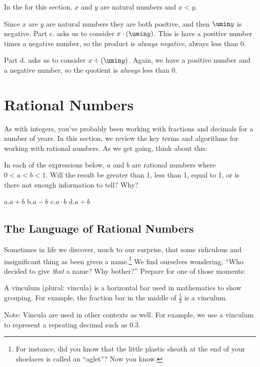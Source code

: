 \begin{boxedex}
In the  for this section, $x$ and $y$ are natural numbers and $x<y$.

Since $x$ are $y$ are natural numbers they are both positive, and then $\umin y$ is negative. Part c. asks us to consider $x\cdot(\umin y)$. This is have a positive number times a negative number, so the product is {\em always negative}, always less than 0.

Part d. asks us to consider $x\div(\umin y)$. Again, we have a positive number and a negative number, so the quotient is {\em always} less than 0.
\end{boxedex}


\section{Rational Numbers}
\label{sec:rationals}

As with integers, you've probably been working with fractions and decimals for a number of years. In this section, we review the key terms and algorithms for working with rational numbers. As we get going, think about this:

\begin{boxedexplore}
In each of the expressions below, $a$ and $b$ are rational numbers where $0 < a < b < 1$. Will the result be greater than 1, less than 1, equal to 1, or is there not enough information to tell? Why?

a.\quad $a+b$
\hfill
b.\quad $a-b$
\hfill
c.\quad $a \cdot b$
\hfill
d.\quad $a \div b$
\hfill
\end{boxedexplore}

\subsection{The Language of Rational Numbers}

Sometimes in life we discover, much to our surprise, that some ridiculous and insignificant thing as been given a name.\footnote{For instance, did you know that the little plastic sheath at the end of your shoelaces is called an ``aglet''? Now you know.} We find ourselves wondering, ``Who decided to give {\em that} a name? Why bother?'' Prepare for one of those moments:

\begin{boxeddef}[Vinculum]
A \gls{vinculum} (plural: vincula) is a horizontal bar used in mathematics to show grouping. For example, the fraction bar in the middle of $\frac{5}{2}$ is a vinculum.

Note: Vincula are used in other contexts as well. For example, we use a vinculum to represent a repeating decimal such as $0.\overline{3}$.
\end{boxeddef}

